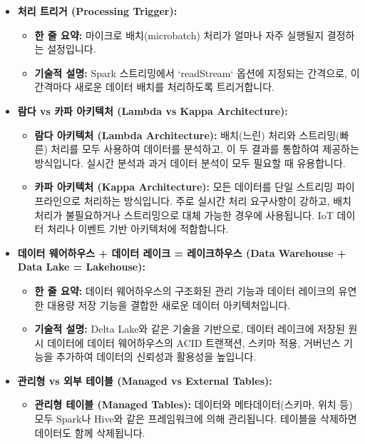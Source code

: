 \documentclass[11pt,a4paper]{article}
\begin{document}
\begin{itemize}
\begin{itemize}
        \item \textbf{추가 (Append):} 새로운 데이터만 출력 싱크에 추가합니다.
    \end{itemize}
    \item \textbf{처리 트리거 (Processing Trigger):}
    \begin{itemize}
        \item \textbf{한 줄 요약:} 마이크로 배치(microbatch) 처리가 얼마나 자주 실행될지 결정하는 설정입니다.
        \item \textbf{기술적 설명:} Spark 스트리밍에서 `readStream` 옵션에 지정되는 간격으로, 이 간격마다 새로운 데이터 배치를 처리하도록 트리거합니다.
    \end{itemize}
    \item \textbf{람다 vs 카파 아키텍처 (Lambda vs Kappa Architecture):}
    \begin{itemize}
        \item \textbf{람다 아키텍처 (Lambda Architecture):} 배치(느린) 처리와 스트리밍(빠른) 처리를 모두 사용하여 데이터를 분석하고, 이 두 결과를 통합하여 제공하는 방식입니다. 실시간 분석과 과거 데이터 분석이 모두 필요할 때 유용합니다.
        \item \textbf{카파 아키텍처 (Kappa Architecture):} 모든 데이터를 단일 스트리밍 파이프라인으로 처리하는 방식입니다. 주로 실시간 처리 요구사항이 강하고, 배치 처리가 불필요하거나 스트리밍으로 대체 가능한 경우에 사용됩니다. IoT 데이터 처리나 이벤트 기반 아키텍처에 적합합니다.
    \end{itemize}
    \item \textbf{데이터 웨어하우스 + 데이터 레이크 = 레이크하우스 (Data Warehouse + Data Lake = Lakehouse):}
    \begin{itemize}
        \item \textbf{한 줄 요약:} 데이터 웨어하우스의 구조화된 관리 기능과 데이터 레이크의 유연한 대용량 저장 기능을 결합한 새로운 데이터 아키텍처입니다.
        \item \textbf{기술적 설명:} Delta Lake와 같은 기술을 기반으로, 데이터 레이크에 저장된 원시 데이터에 데이터 웨어하우스의 ACID 트랜잭션, 스키마 적용, 거버넌스 기능을 추가하여 데이터의 신뢰성과 활용성을 높입니다.
    \end{itemize}
    \item \textbf{관리형 vs 외부 테이블 (Managed vs External Tables):}
    \begin{itemize}
        \item \textbf{관리형 테이블 (Managed Tables):} 데이터와 메타데이터(스키마, 위치 등) 모두 Spark나 Hive와 같은 프레임워크에 의해 관리됩니다. 테이블을 삭제하면 데이터도 함께 삭제됩니다.

\end{itemize}
\end{itemize}
\end{document}
